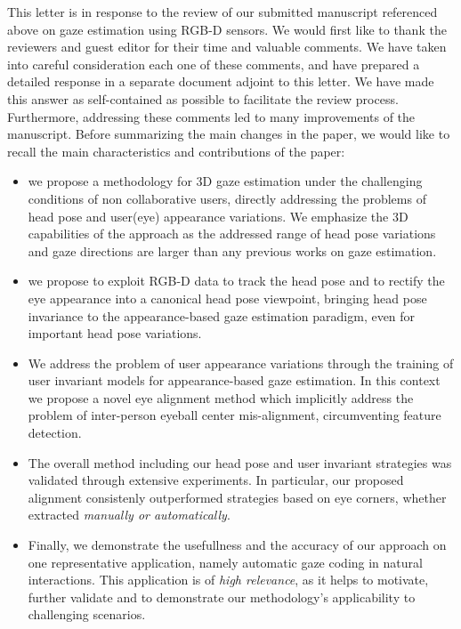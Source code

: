 \documentclass[12pt]{article}
\begin{document}
This letter is in response to the review of our submitted manuscript referenced above on 
gaze estimation using RGB-D sensors.
%
We would first like to thank  the reviewers and guest editor for their time and valuable comments.
We have taken into careful consideration each one of these comments, and have prepared a detailed response
in a separate document adjoint to this letter. 
We have made this answer as self-contained as possible to facilitate the review process.
%
Furthermore, addressing these comments led to many improvements of the manuscript. 
%
Before summarizing the main changes in the paper, we would like to recall the main characteristics and 
contributions of the paper:
\begin{itemize}
\item  we propose a methodology for 3D gaze estimation under the challenging conditions of non collaborative users,  directly addressing the problems of head pose and user(eye) appearance variations. 
We emphasize the 3D capabilities of the approach
as the addressed  range of head pose variations
and gaze directions are larger than any previous works on gaze estimation.
%
\item we propose to exploit RGB-D data to track the head pose and to rectify the eye
appearance into a canonical head pose viewpoint, bringing head pose invariance to the appearance-based gaze
estimation paradigm, even for important head pose variations. 
\item We address the problem of user appearance variations through the training of user invariant models for appearance-based gaze estimation. In this context we  propose a novel eye alignment method which implicitly 
address the problem of inter-person eyeball center mis-alignment, circumventing feature detection. 
%
\item The overall method including our head pose and user invariant strategies was validated through 
extensive experiments. 
%
In particular, our proposed alignment consistenly outperformed strategies based on eye corners, whether extracted 
{\em manually or automatically}. 
%
\item Finally, we demonstrate the usefullness and the accuracy of our approach on one representative application, 
namely automatic gaze coding in natural interactions. 
This application is of {\em high relevance}, as it helps to motivate, further validate  and to demonstrate
our methodology's applicability to challenging scenarios.
\end{itemize}
\end{document}
